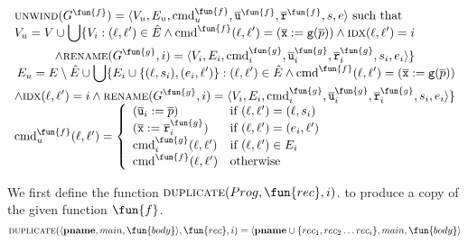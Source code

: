 \[
\begin{array}{l}
\textsc{unwind}(G^\fun{f}) = \langle V_u, E_u,\textmd{cmd}_u^\fun{f}, \overline{\texttt{u}}^\fun{f}, \overline{\texttt{r}}^\fun{f},s,e \rangle \text{ such that} \\

\begin{split}
 V_u = V\cup\bigcup\{V_i:(\ell,\ell')\in\hat{E} \wedge \textmd{cmd}^\fun{f}(\ell,\ell')=(\overline{\texttt{x}}:=\mathtt{g}(\overline{p}))\wedge\textsc{idx}(\ell, \ell')=i  \\
  \wedge \textsc{rename}(G^\fun{g},i)=\langle V_i, E_i,\textmd{cmd}^\fun{g}_i, \overline{\texttt{u}}^\fun{g}_i, \overline{\texttt{r}}^\fun{g}_i,s_i,e_i\rangle \}
\end{split}\\

\begin{split}
 E_u = E \setminus \hat{E} \cup \bigcup\{E_i\cup\{(\ell, s_i),(e_i, \ell')\}: (\ell, \ell')\in \hat{E} \wedge \textmd{cmd}^\fun{f}(\ell, \ell')=(\overline{\texttt{x}}:=\mathtt{g}(\overline{p})) \\
  \wedge \textsc{idx}(\ell, \ell')=i \wedge \textsc{rename}(G^\fun{g},i) =
\langle V_i, E_i,\textmd{cmd}^\fun{g}_i, \overline{\texttt{u}}^\fun{g}_i, \overline{\texttt{r}}^\fun{g}_i,s_i,e_i\rangle \} 
\end{split}\\

\textmd{cmd}_u^\fun{f} (\ell, \ell') =
\left\{
  \begin{array}{ll}
  (\overline{\texttt{u}}_i:=\overline{p}) &\text{if } (\ell,\ell')=(\ell,s_i)
  \\
  (\overline{\texttt{x}}:=\overline{\texttt{r}}^\fun{g}_i) &\text{if } (\ell,\ell')=(e_i,\ell') \\
  \textmd{cmd}^\fun{g}_i(\ell, \ell') &\text{if } (\ell, \ell') \in E_i \\
  \textmd{cmd}^\fun{f}(\ell,\ell') &\text{otherwise}
  \end{array}
\right.

\end{array}
\]



We first define the function \(\textsc{duplicate}(Prog, \fun{rec},i)\). to produce a copy of the given function $\fun{f}$.
\begin{equation*}
  \textsc{duplicate}(\langle \mathbf{pname},main,\fun{body}\rangle, \fun{rec},i) 
    = \langle \mathbf{pname}\cup\{rec_1, rec_2\dotsc rec_i\},main,\fun{body}\rangle
\end{equation*}




